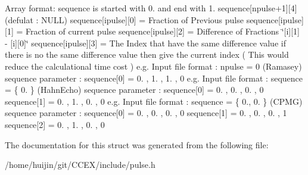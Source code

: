 Array format\-: sequence is started with 0. and end with 1. sequence\mbox{[}npulse+1\mbox{]}\mbox{[}4\mbox{]} (defulat \-: N\-U\-L\-L) sequence\mbox{[}ipulse\mbox{]}\mbox{[}0\mbox{]} = Fraction of Previous pulse sequence\mbox{[}ipulse\mbox{]}\mbox{[}1\mbox{]} = Fraction of current pulse sequence\mbox{[}ipulse\mbox{]}\mbox{[}2\mbox{]} = Difference of Fractions \char`\"{}\mbox{[}i\mbox{]}\mbox{[}1\mbox{]} -\/ \mbox{[}i\mbox{]}\mbox{[}0\mbox{]}\char`\"{} sequence\mbox{[}ipulse\mbox{]}\mbox{[}3\mbox{]} = The Index that have the same difference value if there is no the same difference value then give the current index ( This would reduce the calculational time cost ) e.\-g. Input file format \-: npulse = 0 (Ramasey) sequence parameter \-: sequence\mbox{[}0\mbox{]} = 0. , 1. , 1. , 0 e.\-g. Input file format \-: sequence = \{ 0. \} (Hahn\-Echo) sequence parameter \-: sequence\mbox{[}0\mbox{]} = 0. , 0. , 0. , 0 sequence\mbox{[}1\mbox{]} = 0. , 1. , 0. , 0 e.\-g. Input file format \-: sequence = \{ 0., 0. \} (C\-P\-M\-G) sequence parameter \-: sequence\mbox{[}0\mbox{]} = 0. , 0. , 0. , 0 sequence\mbox{[}1\mbox{]} = 0. , 0. , 0. , 1 sequence\mbox{[}2\mbox{]} = 0. , 1. , 0. , 0 

The documentation for this struct was generated from the following file\-:\begin{DoxyCompactItemize}
\item 
/home/huijin/git/\-C\-C\-E\-X/include/pulse.\-h\end{DoxyCompactItemize}
